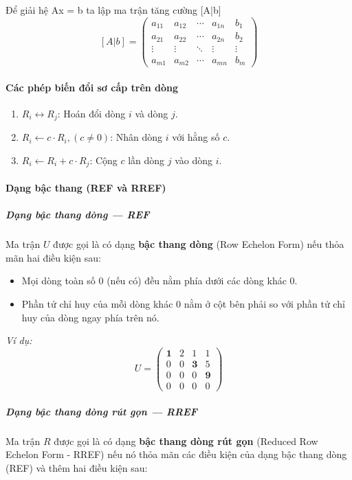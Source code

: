 \documentclass[12pt,a4paper]{article}
\begin{document}
Để giải hệ Ax = b ta lập ma trận tăng cường [A|b]\\
$$[A | b] = 
\left( \begin{array}{cccc|c}
a_{11} & a_{12} & \cdots & a_{1n} & b_1 \\
a_{21} & a_{22} & \cdots & a_{2n} & b_2 \\
\vdots & \vdots & \ddots & \vdots & \vdots \\
a_{m1} & a_{m2} & \cdots & a_{mn} & b_m
\end{array} \right)
$$

\paragraph{Các phép biến đổi sơ cấp trên dòng}
\begin{enumerate}
    \item $R_i \leftrightarrow R_j$: Hoán đổi dòng $i$ và dòng $j$.
    \item $R_i \leftarrow c \cdot R_i, (c \neq 0)$: Nhân dòng $i$ với hằng số $c$.
    \item $R_i \leftarrow R_i + c \cdot R_j$: Cộng $c$ lần dòng $j$ vào dòng $i$.
\end{enumerate}

\paragraph{Dạng bậc thang (REF và RREF)}
\subparagraph{Dạng bậc thang dòng — REF}
\noindent Ma trận $U$ được gọi là có dạng \textbf{bậc thang dòng} (Row Echelon Form) nếu thỏa mãn hai điều kiện sau:
\begin{itemize}
    \item Mọi dòng toàn số 0 (nếu có) đều nằm phía dưới các dòng khác 0.
    \item Phần tử chỉ huy của mỗi dòng khác 0 nằm ở cột bên phải so với phần tử chỉ huy của dòng ngay phía trên nó.
\end{itemize}

\textit{Ví dụ:}
\[
U = \begin{pmatrix}
\mathbf{1} & 2 & 1 & 1 \\
0 & 0 & \mathbf{3} & 5 \\
0 & 0 & 0 & \mathbf{9} \\
0 & 0 & 0 & 0
\end{pmatrix}
\]

\subparagraph{Dạng bậc thang dòng rút gọn — RREF}
\noindent Ma trận $R$ được gọi là có dạng \textbf{bậc thang dòng rút gọn} (Reduced Row Echelon Form - RREF) nếu nó thỏa mãn các điều kiện của dạng bậc thang dòng (REF) và thêm hai điều kiện sau:
\end{document}
